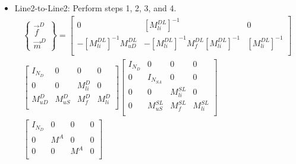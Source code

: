 \documentclass[10pt,letterpaper,oneside,notitlepage]{article}
\begin{document}
\begin{itemize}
  \item Line2-to-Line2: Perform steps 1, 2, 3, and 4.
         \begin{multline}
            \left\{   \begin{matrix} \vec{f}^{D} \\ \vec{m}^{D} \end{matrix} \right\} 
           =
            \begin{bmatrix}
            0                       & \left[ M_{li}^{DL} \right]^{-1} & 0   \\
            -\left[ M_{li}^{DL} \right]^{-1} M_{uD}^{DL} & 
            -\left[ M_{li}^{DL} \right]^{-1} M_{f}^{DL} \left[ M_{li}^{DL} \right]^{-1}  &
             \left[ M_{li}^{DL} \right]^{-1} \\
            \end{bmatrix}                  
            \\                                 
           \begin{bmatrix}
            I_{N_D}              & 0                      & 0          & 0          \\
            0                    & 0                      & M_{li}^{D} & 0          \\
            M_{uD}^{D}           & M_{uS}^{D}             & M_{f}^{D}  & M_{li}^{D} \\
            \end{bmatrix}            
            \begin{bmatrix}
            I_{N_D}              & 0                     & 0           & 0                \\
            0                    & I_{\mathit{N_{SA}}}   & 0           & 0                \\
            0                    & 0                     & M_{li}^{SL} & 0                \\
            0                    & M_{uS}^{SL}           & M_{f}^{SL}  & M_{li}^{SL}      \\
            \end{bmatrix}
            \\            
            \begin{bmatrix}
            I_{\mathit{N_D}}     & 0   & 0   & 0   \\
            0                    & M^A & 0   & 0   \\
            0                    & 0   & M^A & 0   \\

\end{bmatrix}
\end{multline}
\end{itemize}
\end{document}
